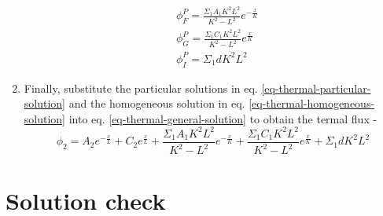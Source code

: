 \documentclass[11pt,a4paper]{article}
\begin{document}
\begin{enumerate}[leftmargin=*,topsep=0pt]
\begin{equation}
\begin{split}
                & \phi_F^P=\frac{\Sigma_1 A_1 K^2 L^2}{K^2-L^2} e^{-\frac{x}{K}} \\
                & \phi_G^P=\frac{\Sigma_1 C_1 K^2 L^2}{K^2-L^2} e^{\frac{x}{K}} \\
                & \phi_I^P=\Sigma_1 d K^2 L^2
            \end{split}
        \end{equation}
    \item Finally, substitute the particular solutions in eq. \ref{eq-thermal-particular-solution} and the homogeneous solution in eq. \ref{eq-thermal-homogeneous-solution} into eq. \ref{eq-thermal-general-solution} to obtain the termal flux - 
        \begin{equation} \label{eq-thermal-diffusion-solution}
            \phi_2=A_2e^{-\frac{x}{L}}+C_2e^{\frac{x}{L}}+\frac{\Sigma_1 A_1 K^2 L^2}{K^2-L^2} e^{-\frac{x}{K}}+\frac{\Sigma_1 C_1 K^2 L^2}{K^2-L^2} e^{\frac{x}{K}}+\Sigma_1 d K^2 L^2
        \end{equation}
\end{enumerate}

\newpage 

\section{Solution check}
\end{document}
